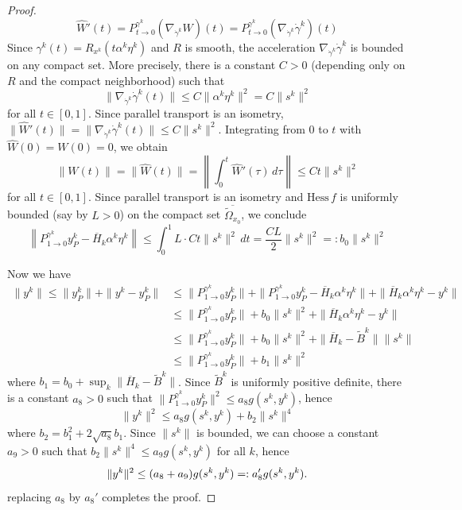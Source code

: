 \documentclass[12pt,a4paper,draft]{article}  %
\theoremstyle{definition}
\numberwithin{equation}{section}
\newcommand{\hess}{\mathrm{Hess}\,}
\begin{document}
\begin{proof}
        \[
        \hat{W}'(t) = P^{\gamma^k}_{t\to 0}\left(\nabla_{\dot{\gamma}^k}W\right)(t) = P^{\gamma^k}_{t\to 0}\left(\nabla_{\dot{\gamma}^k}\dot{\gamma}^k\right)(t)
        \]
        Since $\gamma^k(t) = R_{x^k}(t\alpha^k\eta^k)$ and $R$ is smooth, the acceleration $\nabla_{\dot{\gamma}^k}\dot{\gamma}^k$ is bounded on any compact set. More precisely, there is a constant $C>0$ (depending only on $R$ and the compact neighborhood) such that
        \[
        \|\nabla_{\dot{\gamma}^k}\dot{\gamma}^k(t)\| \leq C\|\alpha^k\eta^k\|^2 = C\|s^k\|^2
        \]
        for all $t\in [0,1]$. Since parallel transport is an isometry, $\|\hat{W}'(t)\| = \|\nabla_{\dot{\gamma}^k}\dot{\gamma}^k(t)\| \leq C\|s^k\|^2$. Integrating from $0$ to $t$ with $\hat{W}(0) = W(0) = 0$, we obtain
        \[
        \|W(t)\| = \|\hat{W}(t)\| = \left\|\int_0^t \hat{W}'(\tau)\,d\tau\right\| \leq Ct\|s^k\|^2
        \]
        for all $t\in [0,1]$. Since parallel transport is an isometry and $\hess f$ is uniformly bounded (say by $L>0$) on the compact set $\overline{\widetilde{\Omega}_{x_0}}$, we conclude
        \[
        \left\|P^{\gamma^k}_{1\to 0}y^k_P - \overline{H}_k\alpha^k\eta^k\right\| \leq \int_0^1 L\cdot Ct\|s^k\|^2\,dt = \frac{CL}{2}\|s^k\|^2 =: b_0\|s^k\|^2
        \]

        Now we have
        \[
        \begin{aligned}
                \|y^k\|\leq \|y^k_P\| + \|y^k - y^k_P\| &\leq \|P^{\gamma^k}_{1\to 0}y^k_P\| + \|P^{\gamma^k}_{1\to 0}y^k_P - \overline{H}_k\alpha^k\eta^k\| + \|\overline{H}_k\alpha^k\eta^k - y^k\|\\
                &\leq \|P^{\gamma^k}_{1\to 0}y^k_P\| + b_0\|s^k\|^2 + \|\overline{H}_k\alpha^k\eta^k - y^k\|\\
                &\leq \|P^{\gamma^k}_{1\to 0}y^k_P\| + b_0\|s^k\|^2 + \|\overline{H}_k - \tilde{B}^k\|\|s^k\|\\
                &\leq \|P^{\gamma^k}_{1\to 0}y^k_P\| + b_1\|s^k\|^2
        \end{aligned}
        \]
        where $b_1 = b_0 + \sup_k\|\overline{H}_k - \tilde{B}^k\|$. Since $\tilde{B}^k$ is uniformly positive definite, there is a constant $a_8 > 0$ such that $\|P^{\gamma^k}_{1\to 0}y^k_P\|^2 \leq a_8 g(s^k,y^k)$, hence
        \[
        \|y^k\|^2 \leq a_8 g(s^k,y^k) + b_2\|s^k\|^4
        \]
        where $b_2 = b_1^2 + 2\sqrt{a_8}b_1$. Since $\|s^k\|$ is bounded, we can choose a constant $a_9 > 0$ such that $b_2\|s^k\|^4 \leq a_9 g(s^k,y^k)$ for all $k$, hence
        \[
        \|y^k\|^2 \leq (a_8 + a_9) g(s^k,y^k) =: a_8' g(s^k,y^k). \qedhere
        \]
        replacing $a_8$ by $a_8'$ completes the proof.
\end{proof}
\end{document}
